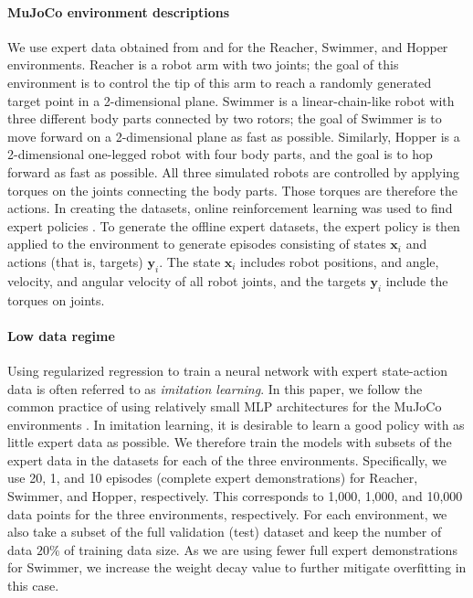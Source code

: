 \documentclass{article}
\theoremstyle{plain}
\theoremstyle{definition}
\theoremstyle{remark}
\newcommand{\bx}{{\mathbf x}}
\newcommand{\byi}{{\mathbf y}_i}
\begin{document}


\paragraph{MuJoCo environment descriptions} We use expert data obtained from \citet{gallouedec2024jack} and \citet{fu2020d4rl} for the Reacher, Swimmer, and Hopper environments. Reacher is a robot arm with two joints; the goal of this environment is to control the tip of this arm to reach a randomly generated target point in a 2-dimensional plane. Swimmer is a linear-chain-like robot with three different body parts connected by two rotors; the goal of Swimmer is to move forward on a 2-dimensional plane as fast as possible. Similarly, Hopper is a 2-dimensional one-legged robot with four body parts, and the goal is to hop forward as fast as possible. All three simulated robots are controlled by applying torques on the joints connecting the body parts. Those torques are therefore the actions. In creating the datasets, online reinforcement learning was used to find expert policies \citep{gallouedec2024jack,fu2020d4rl}. To generate the offline expert datasets, the expert policy is then applied to the environment to generate episodes consisting of states $\bx_i$ and actions (that is, targets) $\byi$. The state $\bx_i$ includes robot positions, and angle, velocity, and angular velocity of all robot joints, and the targets $\byi$ include the torques on joints. 

\paragraph{Low data regime} Using regularized regression to train a neural network with expert state-action data is often referred to as {\em imitation learning}. In this paper, we follow the common practice of using relatively small MLP architectures for the MuJoCo environments \citep{tarasov2022corl}. In imitation learning, it is desirable to learn a good policy with as little expert data as possible. We therefore train the models with subsets of the expert data in the datasets for each of the three environments. Specifically, we use 20, 1, and 10 episodes (complete expert demonstrations) for Reacher, Swimmer, and Hopper, respectively. This corresponds to 1,000, 1,000, and 10,000 data points for the three environments, respectively. For each environment, we also take a subset of the full validation (test) dataset and keep the number of data $20\%$ of training data size. As we are using fewer full expert demonstrations for Swimmer, we increase the weight decay value to further mitigate overfitting in this case.
\end{document}
